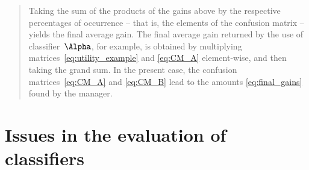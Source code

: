 \documentclass[\ifafour a4paper,12pt,\else a5paper,10pt,\fi%
onecolumn,oneside,article,%
british%
]{memoir}
\theoremstyle{remark}
\theoremstyle{innote}
\renewcommand*{\|}[1][]{\nonscript\:#1\vert\nonscript\:\mathopen{}}
\begin{document}
\begin{quotation}
Taking the sum of the products of the gains above by the respective percentages of occurrence -- that is, the elements of the confusion matrix -- yields the final average gain. The final average gain returned by the use of classifier~$\Alpha$, for example, is obtained by multiplying matrices~\eqref{eq:utility_example} and \eqref{eq:CM_A} element-wise, and then taking the grand sum. In the present case, the confusion matrices~\eqref{eq:CM_A} and \eqref{eq:CM_B} lead to the amounts \eqref{eq:final_gains} found by the manager.




\end{quotation}

\section{Issues in the evaluation of classifiers}
\label{sec:issues}
\end{document}
